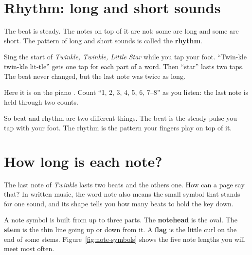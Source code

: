 \section{Rhythm: long and short sounds}

The beat is steady. The notes on top of it are not: some are long and some are short. The pattern of long and short sounds is called the \textbf{rhythm}.

Sing the start of \emph{Twinkle, Twinkle, Little Star} while you tap your foot. ``Twin-kle twin-kle lit-tle'' gets one tap for each part of a word. Then ``star'' lasts two taps. The beat never changed, but the last note was twice as long.

Here it is on the piano . Count ``1, 2, 3, 4, 5, 6, 7--8'' as you listen: the last note is held through two counts.

So beat and rhythm are two different things. The beat is the steady pulse you tap with your foot. The rhythm is the pattern your fingers play on top of it.

\section{How long is each note?}

The last note of \emph{Twinkle} lasts two beats and the others one. How can a page say that? In written music, the word note also means the small symbol that stands for one sound, and its shape tells you how many beats to hold the key down.

A note symbol is built from up to three parts. The \textbf{notehead} is the oval. The \textbf{stem} is the thin line going up or down from it. A \textbf{flag} is the little curl on the end of some stems. Figure~\ref{fig:note-symbols} shows the five note lengths you will meet most often.


